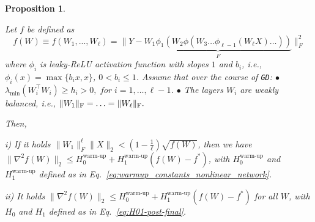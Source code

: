 \documentclass[a4paper,11pt]{article}
\newcommand{\algname}[1]{\texttt{#1}}
\newcommand{\1}{\mathbbm{1}}
\theoremstyle{plain}
\newtheorem{proposition}[theorem]{Proposition}
\begin{document}
\begin{proposition}
\label{prop:deep_non_linear_many_nonlinearities}

Let $f$ be defined as
\begin{equation*}
    f(W) \equiv f(W_1,...,W_{\ell}) = \|Y- \underbrace{W_1 \phi_1(W_2 \phi(W_3 \dots \phi_{\ell-1}(W_{\ell} X) \dots ))}_F\|_F^2
\end{equation*}
where $\phi_i$ is leaky-ReLU activation function with slopes $1$ and $b_i$, i.e., $\phi_i(x)=\max \lbrace b_i x,x \rbrace$, $0 < b_i \leq 1$.
Assume that over the course of \algname{GD}:
\newline $\bullet$ $\lambda_{\min}(W_i^\top W_i) \geq h_i >0,$ for $i=1,\dots,\ell-1$.
\newline $\bullet$ The layers $W_i$ are weakly balanced, i.e., $\|W_1\|_{\rm F} = \ldots =\|W_{\ell}\|_{\rm F}.$

Then,

i) If it holds $\|W_1\|_F^{\ell} \|X\|_2 < (1-\frac{1}{\ell}) \sqrt{f(W)}$, then
we have $\|\nabla^2 f(W)\|_2 \leq H_0^{\text{warm-up}} + H_1^{\text{warm-up}} (f(W)-f^*)$, with $H_0^{\text{warm-up}}$ and $H_1^{\text{warm-up}}$ defined as in Eq.~\eqref{eq:warmup_constants_nonlinear_network}.

ii) It holds $\|\nabla^2 f(W)\|_2 \leq H_0^{\text{warm-up}} + H_1^{\text{warm-up}} (f(W)-f^*)$ for all $W$, with $H_0$ and $H_1$ defined as in Eq.~\eqref{eq:H01-post-final}.


    
\end{proposition}
\end{document}
